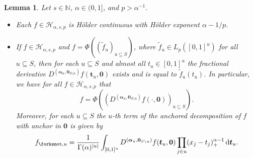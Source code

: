 \documentclass[12pt]{article}
\newtheorem{lemma}{Lemma}
\newcommand{\bst}{\boldsymbol{t}}
\newcommand{\bsalpha}{\boldsymbol{\alpha}}
\newcommand{\bszero}{\boldsymbol{0}}
\newcommand{\NN}{\mathbb{N}}
\newcommand{\HH}{\mathcal{H}}
\begin{document}
\begin{lemma}\label{s-Derivative}
Let $s\in \NN$, $\alpha\in (0,1]$, and $p>\alpha^{-1}$.
\begin{itemize}
\item[{\rm (}i{\rm )}]
Each $f\in \HH_{\alpha,s,p}$ is H\"older continuous with H\"older
exponent $\alpha-1/p$.
\item[{\rm (}ii{\rm )}]
If $f\in \HH_{\alpha,s,p}$ and
$f = \Phi((\tilde{f}_u)_{u\subseteq S})$, where
$\tilde{f}_u \in L_p([0,1]^{u})$ for all $u\subseteq S$,
then for each $u \subseteq S$ and almost all
$t_u\in [0,1]^{u}$ the fractional derivative
$D^{(\bsalpha_u, \bszero_{S\setminus u})}f(\bst_u, \bszero)$
exists and is equal to $\tilde{f}_u(t_u)$.
In particular, we have for all $f\in \HH_{\alpha,s,p}$ that
\begin{equation*}
f = \Phi((D^{(\bsalpha_u, \bszero_{S\setminus u})}
f(\cdot, \bszero))_{u\subseteq S}).
\end{equation*}
Moreover, for each $u\subseteq S$ the $u$-th term of the anchored decomposition
of $f$ with anchor in $\bszero$ is given by
\begin{equation}\label{anchored_decomp}
f_{\forksnot, u} = \frac{1}{\Gamma(\alpha)^{|u|}} \int_{[0,1]^u}  
D^{(\bsalpha_u, \bszero_{S\setminus u})} f(\bst_u,  \bszero) \prod_{j\in u} (x_j-t_j)_+^{\alpha -1}
\, {\rm d} \bst_u.
\end{equation}
\end{itemize}
\end{lemma}
\end{document}
